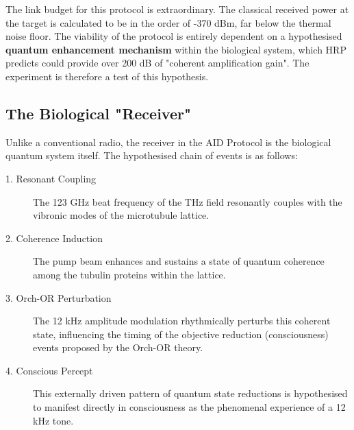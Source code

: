 \begin{warningbox}
    The link budget for this protocol is extraordinary. The classical received power at the target is calculated to be in the order of -370 dBm, far below the thermal noise floor. The viability of the protocol is entirely dependent on a hypothesised \textbf{quantum enhancement mechanism} within the biological system, which HRP predicts could provide over 200 dB of "coherent amplification gain". The experiment is therefore a test of this hypothesis.
\end{warningbox}


\subsection{The Biological "Receiver"}

Unlike a conventional radio, the receiver in the AID Protocol is the biological quantum system itself. The hypothesised chain of events is as follows:
\begin{description}
    \item[1. Resonant Coupling] The 123 GHz beat frequency of the THz field resonantly couples with the vibronic modes of the microtubule lattice.
    \item[2. Coherence Induction] The pump beam enhances and sustains a state of quantum coherence among the tubulin proteins within the lattice.
    \item[3. Orch-OR Perturbation] The 12 kHz amplitude modulation rhythmically perturbs this coherent state, influencing the timing of the objective reduction (consciousness) events proposed by the Orch-OR theory.
    \item[4. Conscious Percept] This externally driven pattern of quantum state reductions is hypothesised to manifest directly in consciousness as the phenomenal experience of a 12 kHz tone.
\end{description}


